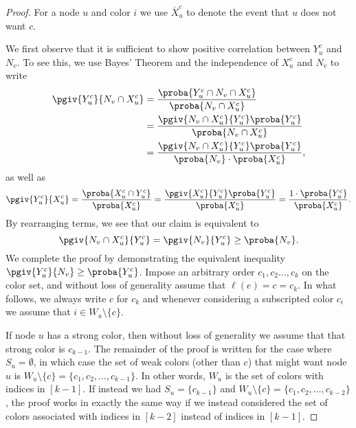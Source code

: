 \lemdependentynx*
\begin{proof}
	For a node $u$ and color $i$ we use $\overline{X}_u^c$ to denote the event that $u$ does not want $c$.

	We first observe that it is sufficient to show positive correlation between $Y_u^c$ and $N_v$. To see this,
	we use Bayes' Theorem and the independence of $X_u^c$ and $N_v$ to write
	\begin{align*}
		\pgiv{Y_u^c}{N_v \cap X_u^c} & = \frac{\proba{Y_u^c \cap N_v \cap X_u^c}}{\proba{N_v \cap X_u^c}}                   \\
		                             & = \frac{\pgiv{N_v \cap X_u^c}{Y_u^c}\proba{Y_u^c}}{\proba{N_v \cap X_u^c}}           \\
		                             & = \frac{\pgiv{N_v \cap X_u^c}{Y_u^c}\proba{Y_u^c}}{\proba{N_v} \cdot \proba{X_u^c}},
	\end{align*}
	as well as
	\[
		\pgiv{Y_u^c}{X_u^c} = \frac{\proba{X_u^c \cap Y_u^c}}{\proba{X_u^c}} = \frac{\pgiv{X_u^c}{Y_u^c}\proba{Y_u^c}}{\proba{X_u^c}} = \frac{1\cdot \proba{Y_u^c}}{\proba{X_u^c}}.
	\]
	By rearranging terms, we see that our claim is equivalent to
	\[
		\pgiv{N_v \cap X_u^c}{Y_u^c} = \pgiv{N_v}{Y_u^c} \geq \proba{N_v}.
	\]
	We complete the proof by demonstrating the equivalent inequality $\pgiv{Y_u^c}{N_v} \geq \proba{Y_u^c}$. Impose an arbitrary order $c_1, c_2 \ldots, c_k$ on the color set, and without loss of generality assume that $\ell(e) = c = c_k$. In what follows, we always write $c$ for $c_k$ and whenever considering a subscripted color $c_i$ we assume that $i \in W_u \setminus \{c\}$.

	If node $u$ has a strong color, then without loss of generality we assume that that strong color is $c_{k-1}$.
	The remainder of the proof is written for the case where $S_u = \emptyset$, in which case the set of weak colors (other than $c$) that might want node $u$ is $W_u \setminus \{c\} = \{c_1, c_2, \hdots, c_{k-1}\}$. In other words, $W_u$ is the set of colors with indices in $[k-1]$. If instead we had $S_u = \{c_{k-1}\}$ and $W_u \setminus \{c\} = \{c_1, c_2, \hdots, c_{k-2}\}$, the proof works in exactly the same way if we instead considered the set of colors associated with indices in $[k-2]$ instead of indices in $[k-1]$.



\end{proof}
